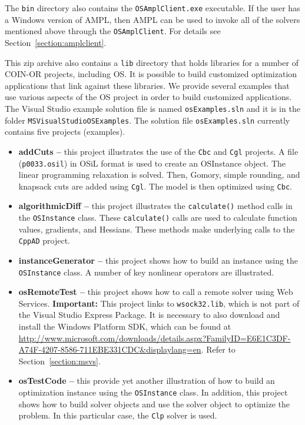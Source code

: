 \documentclass[11pt]{article}
\renewcommand{\_}{{\char"5F}}
\renewcommand{\{}{{\char"7B}}
\renewcommand{\}}{{\char"7D}}
\renewcommand{\^}{{\char"0D}}
\renewcommand{\'}{{\char"0D}}
\begin{document}
The {\tt bin} directory also contains the {\tt OSAmplClient.exe} executable. If the user has a Windows version of AMPL, 
then AMPL can be used to invoke all of the solvers mentioned above through the {\tt OSAmplClient}.  For details 
see Section~\ref{section:amplclient}.



This zip archive also contains a  {\tt lib} directory that holds  libraries for a number of COIN-OR projects, including OS.
It is possible to build customized optimization applications that link against these libraries. We provide several examples
that use various aspects of the OS project in order to build customized applications. 
The Visual Studio example solution file is named {\tt osExamples.sln} and it is in the folder {\tt MSVisualStudioOSExamples}.  
The solution file {\tt osExamples.sln}  currently contains five projects (examples).

\begin{itemize}

\item[]  {\bf addCuts --} this project illustrates the use of  the {\tt Cbc} and {\tt Cgl} projects. 
A file ({\tt p0033.osil}) in OSiL format is used to create an OSInstance object. The linear programming relaxation 
is solved. Then, Gomory, simple rounding, and knapsack cuts are added using {\tt Cgl}.  The model is then optimized 
using {\tt Cbc}.



\item[]  {\bf algorithmicDiff --} this project illustrates the {\tt calculate()} method calls in the {\tt OSInstance} class.
These {\tt calculate()} calls are used to calculate function values, gradients, and Hessians. These methods make underlying 
calls to the {\tt CppAD} project.


\item[]  {\bf instanceGenerator --}  this project shows  how to build an instance using the {\tt OSInstance} class.   
A number of key nonlinear operators are illustrated. 


\item[]  {\bf osRemoteTest --}  this project shows  how to call a remote solver using Web Services. {\bf Important:}  
This project links to {\tt wsock32.lib}, which is not part of the Visual Studio  Express Package.  It is necessary 
to also download and install the Windows Platform SDK, which can be found at
\url{http://www.microsoft.com/downloads/details.aspx?FamilyID=E6E1C3DF-A74F-4207-8586-711EBE331CDC&displaylang=en}.  
Refer to Section~\ref{section:msvs}.

\item[] {\bf osTestCode --} this provide yet another illustration of how to build an optimization instance using the 
{\tt OSInstance} class.  In addition, this project  shows how to build solver objects and use the solver object to 
optimize the problem. In this particular case, the {\tt Clp} solver is used.

\end{itemize}
\end{document}
